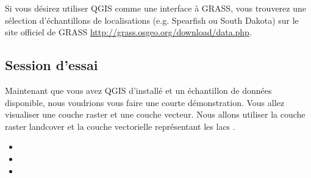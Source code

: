 Si vous désirez utiliser QGIS comme une interface à GRASS, vous trouverez une sélection d'échantillons de localisations (e.g. Spearfish ou South Dakota) sur le site officiel de GRASS \url{http://grass.osgeo.org/download/data.php}. 


\subsection{Session d'essai}\label{samplesession}

Maintenant que vous avez QGIS d'installé et un échantillon de données disponible, nous voudrions vous faire une courte démonstration. Vous allez visualiser une couche raster et une couche vecteur. Nous allons utiliser la couche raster landcover  et la couche vectorielle représentant les lacs .



\begin{itemize} \item {}
\item {}
\item {}
\end{itemize} 

